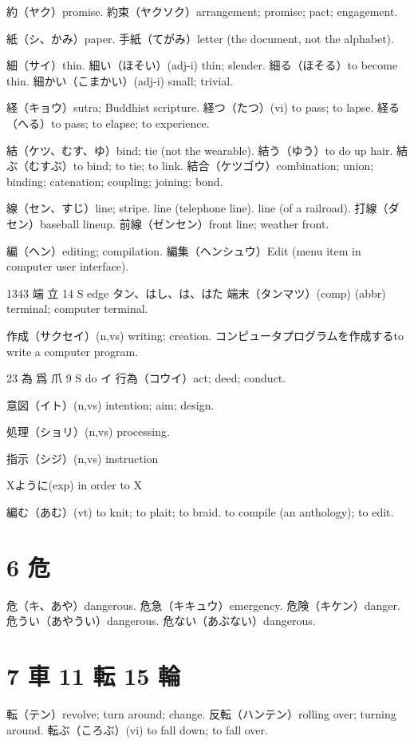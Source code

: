 約（ヤク）promise.
約束（ヤクソク）arrangement; promise; pact; engagement.

紙（シ、かみ）paper.
手紙（てがみ）letter (the document, not the alphabet).

細（サイ）thin.
細い（ほそい）(adj-i) thin; slender.
細る（ほそる）to become thin.
細かい（こまかい）(adj-i) small; trivial.

経（キョウ）sutra; Buddhist scripture.
経つ（たつ）(vi) to pass; to lapse.
経る（へる）to pass; to elapse; to experience.

結（ケツ、むす、ゆ）bind; tie (not the wearable).
結う（ゆう）to do up hair.
結ぶ（むすぶ）to bind; to tie; to link.
結合（ケツゴウ）combination; union; binding; catenation; coupling; joining; bond.

線（セン、すじ）line; stripe.
line (telephone line).
line (of a railroad).
打線（ダセン）baseball lineup.
前線（ゼンセン）front line; weather front.

編（ヘン）editing; compilation.
編集（ヘンシュウ）Edit (menu item in computer user interface).

1343	端		立	14	S		edge	タン、はし、は、はた
端末（タンマツ）(comp) (abbr) terminal; computer terminal.

作成（サクセイ）(n,vs) writing; creation.
コンピュータプログラムを作成するto write a computer program.

23	為	爲	爪	9	S		do	イ
行為（コウイ）act; deed; conduct.

意図（イト）(n,vs) intention; aim; design.

処理（ショリ）(n,vs) processing.

指示（シジ）(n,vs) instruction

Xように(exp) in order to X

編む（あむ）(vt)
to knit; to plait; to braid.
to compile (an anthology); to edit.

\section{6 危}

危（キ、あや）dangerous.
危急（キキュウ）emergency.
危険（キケン）danger.
危うい（あやうい）dangerous.
危ない（あぶない）dangerous.

\section{7 車 11 転 15 輪}

転（テン）revolve; turn around; change.
反転（ハンテン）rolling over; turning around.
転ぶ（ころぶ）(vi) to fall down; to fall over.

